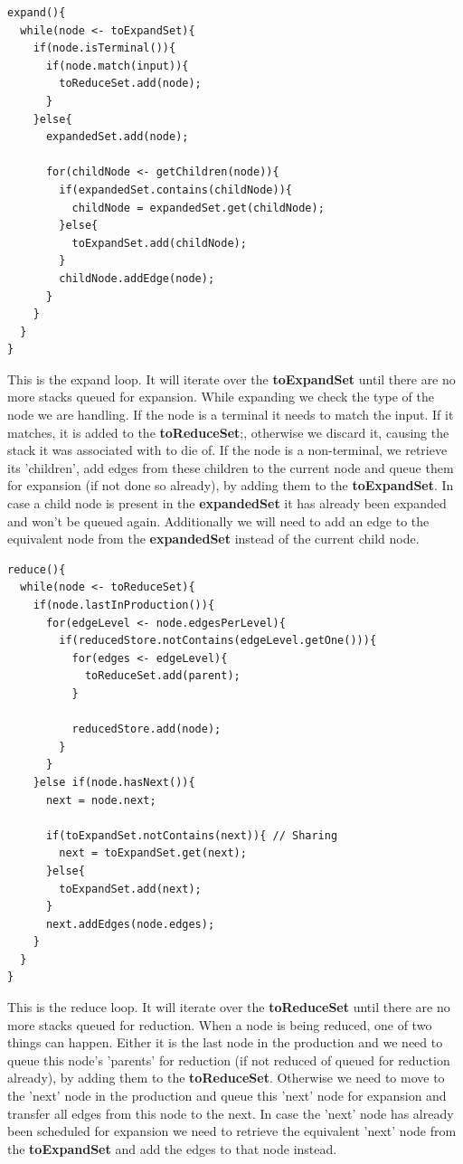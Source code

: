 \documentclass[a4paper,10pt]{article}
\begin{document}
{\small
\begin{verbatim}
expand(){
  while(node <- toExpandSet){
    if(node.isTerminal()){
      if(node.match(input)){
        toReduceSet.add(node);
      }
    }else{
      expandedSet.add(node);
      
      for(childNode <- getChildren(node)){
        if(expandedSet.contains(childNode)){
          childNode = expandedSet.get(childNode);
        }else{
          toExpandSet.add(childNode);
        }
        childNode.addEdge(node);
      }
    }
  }
}
\end{verbatim}
}

This is the expand loop. It will iterate over the {\bf toExpandSet} until there are no more stacks queued for expansion. While expanding we check the type of the node we are handling. If the node is a terminal it needs to match the input. If it matches, it is added to the {\bf toReduceSet};, otherwise we discard it, causing the stack it was associated with to die of. If the node is a non-terminal, we retrieve its 'children', add edges from these children to the current node and queue them for expansion (if not done so already), by adding them to the {\bf toExpandSet}. In case a child node is present in the {\bf expandedSet} it has already been expanded and won't be queued again. Additionally we will need to add an edge to the equivalent node from the {\bf expandedSet} instead of the current child node.

{\small
\begin{verbatim}
reduce(){
  while(node <- toReduceSet){
    if(node.lastInProduction()){
      for(edgeLevel <- node.edgesPerLevel){
        if(reducedStore.notContains(edgeLevel.getOne())){
          for(edges <- edgeLevel){
            toReduceSet.add(parent);
          }
          
          reducedStore.add(node);
        }
      }
    }else if(node.hasNext()){
      next = node.next;
      
      if(toExpandSet.notContains(next)){ // Sharing
        next = toExpandSet.get(next);
      }else{
        toExpandSet.add(next);
      }
      next.addEdges(node.edges);
    }
  }
}
\end{verbatim}
}

This is the reduce loop. It will iterate over the {\bf toReduceSet} until there are no more stacks queued for reduction. When a node is being reduced, one of two things can happen. Either it is the last node in the production and we need to queue this node's 'parents' for reduction (if not reduced of queued for reduction already), by adding them to the {\bf toReduceSet}. Otherwise we need to move to the 'next' node in the production and queue this 'next' node for expansion and transfer all edges from this node to the next. In case the 'next' node has already been scheduled for expansion we need to retrieve the equivalent 'next' node from the {\bf toExpandSet} and add the edges to that node instead.
\end{document}
